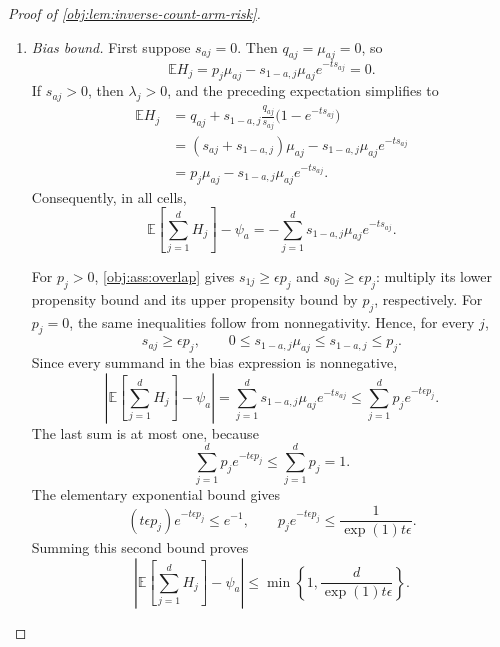 \documentclass[11pt]{article}
\begin{document}
\begin{proof}[Proof of \cref{obj:lem:inverse-count-arm-risk}]
\begin{enumerate}
\item \emph{Bias bound.}
First suppose \(s_{aj}=0\). Then \(q_{aj}=\mu_{aj}=0\), so
\[
\mathbb E H_j
=p_j\mu_{aj}-s_{1-a,j}\mu_{aj}e^{-t s_{aj}}
=0.
\]
If \(s_{aj}>0\), then \(\lambda_j>0\), and the preceding expectation simplifies to
\[
\begin{aligned}
\mathbb E H_j
&=q_{aj}
+s_{1-a,j}\frac{q_{aj}}{s_{aj}}
  \bigl(1-e^{-t s_{aj}}\bigr)\\
&=(s_{aj}+s_{1-a,j})\mu_{aj}
-s_{1-a,j}\mu_{aj}e^{-t s_{aj}}\\
&=p_j\mu_{aj}-s_{1-a,j}\mu_{aj}e^{-t s_{aj}}.
\end{aligned}
\]
Consequently, in all cells,
\[
\mathbb E\!\left[\sum_{j=1}^{d}H_j\right]-\psi_a
=-\sum_{j=1}^{d}s_{1-a,j}\mu_{aj}e^{-t s_{aj}}.
\]

For \(p_j>0\), \cref{obj:ass:overlap} gives
\(s_{1j}\ge\epsilon p_j\) and \(s_{0j}\ge\epsilon p_j\):
multiply its lower propensity bound and its upper propensity bound by
\(p_j\), respectively. For \(p_j=0\), the same inequalities follow from
nonnegativity. Hence, for every \(j\),
\[
s_{aj}\ge\epsilon p_j,\qquad
0\le s_{1-a,j}\mu_{aj}\le s_{1-a,j}\le p_j.
\]
Since every summand in the bias expression is nonnegative,
\[
\left|\mathbb E\!\left[\sum_{j=1}^{d}H_j\right]-\psi_a\right|
=\sum_{j=1}^{d}s_{1-a,j}\mu_{aj}e^{-t s_{aj}}
\le\sum_{j=1}^{d}p_j e^{-t\epsilon p_j}.
\]
The last sum is at most one, because
\[
\sum_{j=1}^{d}p_j e^{-t\epsilon p_j}
\le\sum_{j=1}^{d}p_j=1.
\]
The elementary exponential bound gives
\[
(t\epsilon p_j)e^{-t\epsilon p_j}\le e^{-1},
\qquad
p_j e^{-t\epsilon p_j}\le\frac1{\exp(1)t\epsilon}.
\]
Summing this second bound proves
\[
\left|\mathbb E\!\left[\sum_{j=1}^{d}H_j\right]-\psi_a\right|
\le
\min\left\{1,\frac{d}{\exp(1)t\epsilon}\right\}.
\]


\end{enumerate}
\end{proof}
\end{document}
